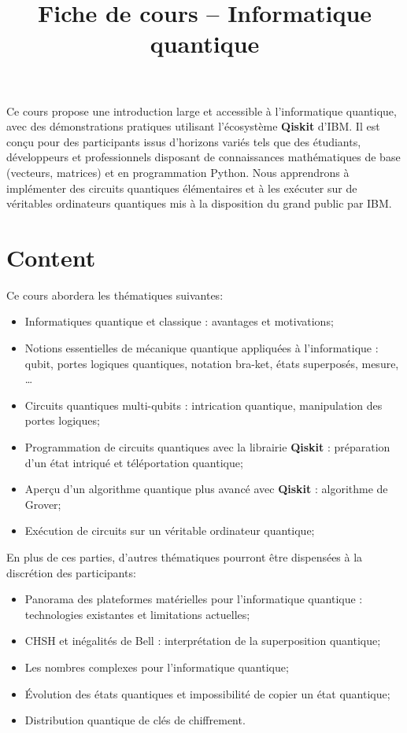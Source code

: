 \documentclass[11pt]{article}
\title{Fiche de cours -- Informatique quantique}
\date{}
\begin{document}
\maketitle

Ce cours propose une introduction large et accessible à l’informatique quantique, avec des démonstrations pratiques utilisant l’écosystème \textbf{Qiskit} d’IBM. Il est conçu pour des participants issus d’horizons variés tels que des étudiants, développeurs et professionnels disposant de connaissances mathématiques de base (vecteurs, matrices) et en programmation Python. Nous apprendrons à implémenter des circuits quantiques élémentaires et à les exécuter sur de véritables ordinateurs quantiques mis à la disposition du grand public par IBM.

\section*{Content}

Ce cours abordera les thématiques suivantes:

\begin{itemize}[leftmargin=*,itemsep=0.4em]
\item Informatiques quantique et classique : avantages et motivations;
\item Notions essentielles de mécanique quantique appliquées à l’informatique : qubit, portes logiques quantiques, notation bra-ket, états superposés, mesure, \ldots
\item Circuits quantiques multi-qubits : intrication quantique, manipulation des portes logiques;
\item Programmation de circuits quantiques avec la librairie \textbf{Qiskit} : préparation d'un état intriqué et téléportation quantique;
\item Aperçu d'un algorithme quantique plus avancé avec \textbf{Qiskit} : algorithme de Grover;
\item Exécution de circuits sur un véritable ordinateur quantique;
\end{itemize}

En plus de ces parties, d'autres thématiques pourront être dispensées à la discrétion des participants:

\begin{itemize}[leftmargin=*,itemsep=0.4em]
\item Panorama des plateformes matérielles pour l’informatique quantique : technologies existantes et limitations actuelles;
\item CHSH et inégalités de Bell : interprétation de la superposition quantique;
\item Les nombres complexes pour l'informatique quantique;
\item Évolution des états quantiques et impossibilité de copier un état quantique;
\item Distribution quantique de clés de chiffrement.
\end{itemize}
\end{document}

